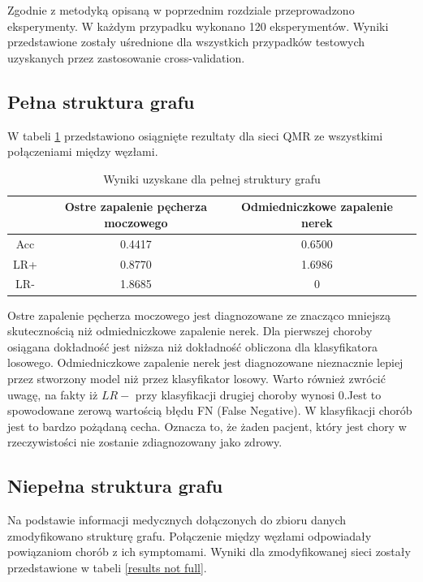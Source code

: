 \documentclass[12pt]{article}
\begin{document}
Zgodnie z metodyką opisaną w poprzednim rozdziale przeprowadzono eksperymenty. W każdym przypadku wykonano 120 eksperymentów. Wyniki przedstawione zostały uśrednione dla wszystkich przypadków testowych uzyskanych przez zastosowanie cross-validation. 

\subsection{Pełna struktura grafu}

W tabeli \ref{results full} przedstawiono osiągnięte rezultaty dla sieci QMR ze wszystkimi połączeniami między węzłami.

\begin{table}[H]
\caption{Wyniki uzyskane dla pełnej struktury grafu}
\label{results full}
\centering
\begin{tabular}{|c|c|c|c|}
  \hline 
   & Ostre zapalenie pęcherza moczowego & Odmiedniczkowe zapalenie nerek \\
  \hline
  Acc & 0.4417 & 0.6500 \\
  \hline
  LR+ & 0.8770 & 1.6986 \\
  \hline
  LR- & 1.8685 & 0 \\
  \hline
\end{tabular}
\end{table}

Ostre zapalenie pęcherza moczowego jest diagnozowane ze znacząco mniejszą skutecznością niż odmiedniczkowe zapalenie nerek. Dla pierwszej choroby osiągana dokładność jest niższa niż dokładność obliczona dla klasyfikatora losowego. Odmiedniczkowe zapalenie nerek jest diagnozowane nieznacznie lepiej przez stworzony model niż przez klasyfikator losowy. Warto również zwrócić uwagę, na fakty iż $LR-$ przy klasyfikacji drugiej choroby wynosi 0.Jest to spowodowane zerową wartością błędu FN (False Negative). W klasyfikacji chorób jest to bardzo pożądaną cecha. Oznacza to, że żaden pacjent, który jest chory w rzeczywistości nie zostanie zdiagnozowany jako zdrowy.

\subsection{Niepełna struktura grafu}

Na podstawie informacji medycznych dołączonych do zbioru danych zmodyfikowano strukturę grafu. Połączenie między węzłami odpowiadały powiązaniom chorób z ich symptomami. Wyniki dla zmodyfikowanej sieci zostały przedstawione w tabeli \ref{results not full}.
\end{document}
